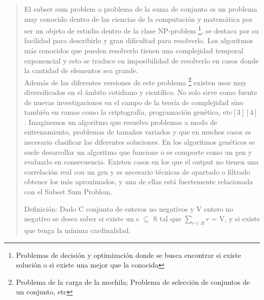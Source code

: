 \documentclass[8pt,a4paper]{article}
\begin{document}
\begin{verse}
	El subset sum problem o problema de la suma de conjunto es un problema muy conocido dentro de las ciencias de la computación y matemática por ser un objeto de estudio dentro de la clase  NP-problem \footnote{Problemas de decisión y optimización donde se busca encontrar si existe solución o si existe una mejor que la conocida}, se destaca por su facilidad para describirlo y gran dificultad para resolverlo. Los algoritmos más conocidos que pueden resolverlo tienen una complejidad temporal exponencial y esto se traduce en imposibilidad de resolverlo en casos donde la cantidad de elementos sea grande. \\
Además de las diferentes versiones de este problema \footnote{Problema de la carga de la mochila; Problema de selección de conjuntos de un conjunto, etc} existen usos muy diversificados en el ámbito cotidiano y científico. No solo sirve como fuente de nuevas investigaciones en el campo de la teoría de complejidad sino también en ramas como la criptografía, programación genética, etc$[3][4]$. Imaginemos un algoritmo que resuelva problemas a modo de entrenamiento, problemas de tamaños variados y que en muchos casos es necesario clasificar las diferentes soluciones. En los algoritmos genéticos se suele desarrollar un algoritmo que funcione o se comporte como un gen y evaluarlo en consecuencia. Existen casos en los que el output no tienen una correlación real con un gen y es necesario técnicas de apartado o filtrado obtener los más aproximados, y una de ellas está fuertemente relacionada con el Subset Sum Problem.

\bigskip
	Definición: Dado C conjunto de enteros no negativos y V entero no negativo se desea saber si existe un s $\subseteq$ S tal que $\sum_{r \in R}r$ = V, y si existe que tenga la mínima cardinalidad.
	

\end{verse}
\end{document}
